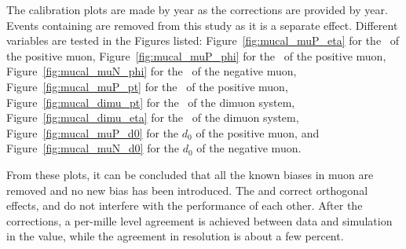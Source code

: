 The calibration plots are made by year as the corrections are provided by year.
Events containing \FSR are removed from this study as it is a separate effect.
Different variables are tested in the Figures listed: 
Figure~\ref{fig:mucal_muP_eta} for the \eta ~of the positive muon,
Figure~\ref{fig:mucal_muP_phi} for the \phi ~of the positive muon,
Figure~\ref{fig:mucal_muN_phi} for the \phi ~of the negative muon,
Figure~\ref{fig:mucal_muP_pt} for the \pt ~of the positive muon,
Figure~\ref{fig:mucal_dimu_pt} for the \pt ~of the dimuon system,
Figure~\ref{fig:mucal_dimu_eta} for the \eta ~of the dimuon system,
Figure~\ref{fig:mucal_muP_d0} for the $d_0$ of the positive muon,
and Figure~\ref{fig:mucal_muN_d0} for the $d_0$ of the negative muon.

From these plots, it can be concluded that all the known biases in muon \pt are removed and no new bias has been introduced.
The \RochCorr and \GeoFit correct orthogonal effects, and do not interfere with the performance of each other.
After the corrections, a per-mille level agreement is achieved between data and simulation in the \mmm value,
while the agreement in \mmm resolution is about a few percent. 

